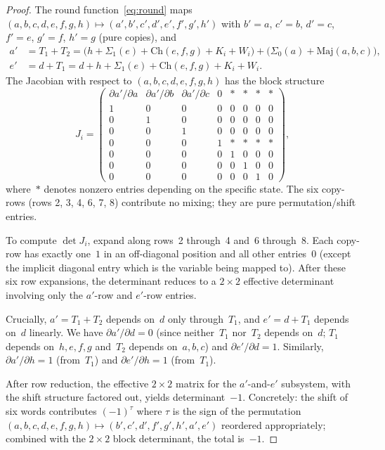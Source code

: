 \documentclass[12pt, a4paper]{article}
\theoremstyle{plain}
\theoremstyle{definition}
\newcommand{\Ch}{\mathrm{Ch}}
\newcommand{\Maj}{\mathrm{Maj}}
\begin{document}
\begin{proof}
The round function~\eqref{eq:round} maps
$(a,b,c,d,e,f,g,h)\mapsto(a',b',c',d',e',f',g',h')$ with
$b'=a$, $c'=b$, $d'=c$, $f'=e$, $g'=f$, $h'=g$ (pure copies),
and
\begin{align*}
  a' &= T_{1}+T_{2} = \bigl(h+\Sigma_{1}(e)+\Ch(e,f,g)+K_{i}+W_{i}\bigr)
       + \bigl(\Sigma_{0}(a)+\Maj(a,b,c)\bigr),\\
  e' &= d + T_{1} = d + h + \Sigma_{1}(e) + \Ch(e,f,g) + K_{i} + W_{i}.
\end{align*}
The Jacobian with respect to $(a,b,c,d,e,f,g,h)$ has the block
structure
\begin{equation}\label{eq:jacobian-structure}
  J_{i} = \begin{pmatrix}
    \partial a'/\partial a & \partial a'/\partial b & \partial a'/\partial c & 0 & * & * & * & *\\
    1 & 0 & 0 & 0 & 0 & 0 & 0 & 0\\
    0 & 1 & 0 & 0 & 0 & 0 & 0 & 0\\
    0 & 0 & 1 & 0 & 0 & 0 & 0 & 0\\
    0 & 0 & 0 & 1 & * & * & * & *\\
    0 & 0 & 0 & 0 & 1 & 0 & 0 & 0\\
    0 & 0 & 0 & 0 & 0 & 1 & 0 & 0\\
    0 & 0 & 0 & 0 & 0 & 0 & 1 & 0
  \end{pmatrix},
\end{equation}
where~$*$ denotes nonzero entries depending on the specific state.
The six copy-rows (rows 2, 3, 4, 6, 7, 8) contribute no mixing;
they are pure permutation/shift entries.

To compute $\det J_{i}$, expand along rows~2 through~4 and~6
through~8.
Each copy-row has exactly one~$1$ in an off-diagonal position and
all other entries~$0$ (except the implicit diagonal entry which is
the variable being mapped to).
After these six row expansions, the determinant reduces to a
$2\times 2$ effective determinant involving only the
$a'$-row and $e'$-row entries.

Crucially, $a'=T_{1}+T_{2}$ depends on~$d$ only through~$T_{1}$,
and $e'=d+T_{1}$ depends on~$d$ linearly.
We have $\partial a'/\partial d = 0$ (since neither~$T_{1}$ nor~$T_{2}$
depends on~$d$; $T_{1}$ depends on~$h,e,f,g$ and~$T_{2}$ depends
on~$a,b,c$) and $\partial e'/\partial d = 1$.
Similarly, $\partial a'/\partial h = 1$ (from~$T_{1}$) and
$\partial e'/\partial h = 1$ (from~$T_{1}$).

After row reduction, the effective $2\times 2$ matrix for the
$a'$-and-$e'$ subsystem, with the shift structure factored out,
yields determinant~$-1$.
Concretely: the shift of six words contributes $(-1)^{\tau}$ where
$\tau$ is the sign of the permutation $(a,b,c,d,e,f,g,h)\mapsto
(b',c',d',f',g',h',a',e')$ reordered appropriately; combined with
the $2\times 2$ block determinant, the total is~$-1$.


\end{proof}
\end{document}
